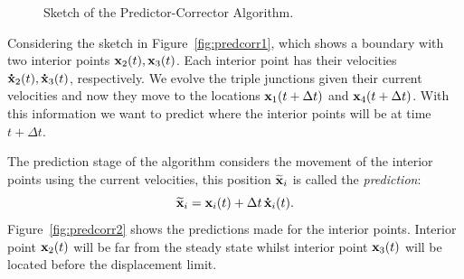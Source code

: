 \begin{figure}[ht]
{
    \label{fig:predcorr4}
    }
    \caption{Sketch of the Predictor-Corrector Algorithm.}
    \label{fig:predcorr_stages}
\end{figure}

Considering the sketch in Figure~\ref{fig:predcorr1}, which shows a boundary with two interior points $\x_2(t), \x_3(t)$. 
Each interior point has their velocities $\dotx_2(t), \dotx_3(t)$, respectively. 
We evolve the triple junctions given their current velocities and now they move to the locations $\x_1(t+\Delta t)$ and $\x_4(t+\Delta t)$. 
With this information we want to predict where the interior points will be at time $t+\Delta t$.

The prediction stage of the algorithm considers the movement of the interior points using the current velocities, this position $\widetilde{\x}_i$ is called the \emph{prediction}:
%
\begin{equation}
    \widetilde{\x}_i = \x_i(t) + \Delta t\,\dotx_i(t).
\end{equation}
%
Figure~\ref{fig:predcorr2} shows the predictions made for the interior points. Interior point $\x_2(t)$ will be far from the steady state whilst interior point $\x_3(t)$ will be located before the displacement limit.

